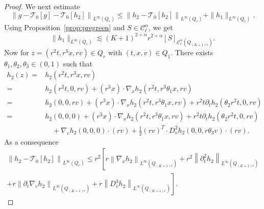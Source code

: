 \documentclass[10pt]{amsart}
\theoremstyle{definition}\newtheorem{defi}[theo]{Definition}\newtheorem{rema}[theo]{Remark}\newtheorem{exam}[theo]{Example}\newtheorem{exem}[theo]{Example}\newtheorem{nota}[theo]{Notation}
\newcommand{\cC}{\mathcal{C}}
\newcommand{\cT}{\mathcal{T}}
\begin{document}
\begin{proof}
We next estimate
\begin{equation}\label{eq:start}
\left\| g - \cT_{0}[g] - \cT_{0}[h_2] \right\|_{L^\infty(Q_r)} \le \left\| h_2 - \cT_{0}[h_2] \right\|_{L^\infty(Q_r)} + \| h_1\|_{L^\infty(Q_r)}.
\end{equation}
Using Proposition~\ref{prop:pregreen} and $S \in \cC^\alpha_\ell$, we get
\begin{equation}\label{eq:g}
\| h_1 \|_{L^\infty(Q_r)} \lesssim (K+1)^{2+\alpha} r^{2+\alpha} [S]_{\cC_\ell^{\alpha}\left(Q_{(K+1)r}\right)}.
\end{equation}
Now for $z = (r^2 t, r^3 x, rv) \in Q_r$ with $(t,x,v) \in Q_1$. There exists $\theta_1, \theta_2, \theta_3 \in (0,1)$ such that
\begin{align*}
h_2(z) = & h_2\left(r^2 t, r^3 x, rv\right) \\
= & h_2\left(r^2 t, 0, rv\right) + \left(r^3 x\right) \cdot \nabla_x h_2 \left(r^2t,r^3 \theta_1 x,r v\right) \\
= & h_2(0, 0, rv) + \left(r^3 x\right) \cdot \nabla_x h_2 \left(r^2t,r^3 \theta_1 x,r v\right) + r^2t \partial_t h_2 \left(\theta_2 r^2 t, 0,r v\right) \\
= & h_2(0,0,0) + \left(r^3 x\right) \cdot \nabla_x h_2 \left(r^2t,r^3 \theta_1 x,r v\right) + r^2t \partial_t h_2 \left(\theta_2 r^2 t, 0,r v\right) \\
& \quad + \nabla_v h_2(0,0,0) \cdot (rv) + \frac12 (rv) ^T \cdot D^2_v h_2(0,0, r \theta_3 v) \cdot (rv).
\end{align*}
As a consequence
\begin{multline*}
\left\| h_2 - \cT_{0}[h_2]\right\|_{L^\infty(Q_r)} \le r^2 \left[r \left\|\nabla_x h_2\right\|_{L^\infty\left(Q_{(K+1)r}\right)} + r^2 \left\|\partial^2_t h_2\right\|_{L^\infty\left(Q_{(K+1)r}\right)}\right. \\
+\left. r \left\|\partial_t \nabla_v h_2 \right\|_{L^\infty\left(Q_{(K+1)r}\right)} + r \left\| D^3_v h_2 \right\|_{L^\infty\left(Q_{(K+1)r}\right)} \right].
\end{multline*}


\end{proof}
\end{document}
